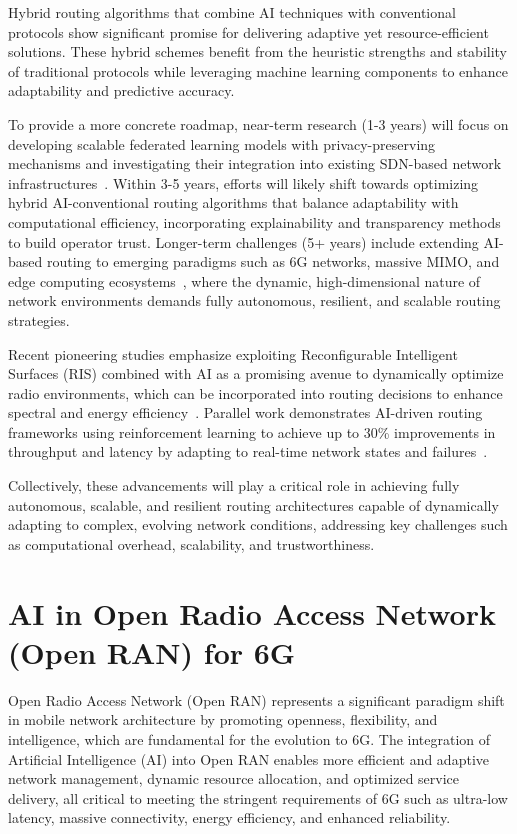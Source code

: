 \documentclass[sigconf]{acmart}
\begin{document}
Hybrid routing algorithms that combine AI techniques with conventional protocols show significant promise for delivering adaptive yet resource-efficient solutions. These hybrid schemes benefit from the heuristic strengths and stability of traditional protocols while leveraging machine learning components to enhance adaptability and predictive accuracy.

To provide a more concrete roadmap, near-term research (1-3 years) will focus on developing scalable federated learning models with privacy-preserving mechanisms and investigating their integration into existing SDN-based network infrastructures~\cite{ref53}. Within 3-5 years, efforts will likely shift towards optimizing hybrid AI-conventional routing algorithms that balance adaptability with computational efficiency, incorporating explainability and transparency methods to build operator trust. Longer-term challenges (5+ years) include extending AI-based routing to emerging paradigms such as 6G networks, massive MIMO, and edge computing ecosystems~\cite{ref53,ref49}, where the dynamic, high-dimensional nature of network environments demands fully autonomous, resilient, and scalable routing strategies.

Recent pioneering studies emphasize exploiting Reconfigurable Intelligent Surfaces (RIS) combined with AI as a promising avenue to dynamically optimize radio environments, which can be incorporated into routing decisions to enhance spectral and energy efficiency~\cite{ref49}. Parallel work demonstrates AI-driven routing frameworks using reinforcement learning to achieve up to 30\% improvements in throughput and latency by adapting to real-time network states and failures~\cite{ref53}.

Collectively, these advancements will play a critical role in achieving fully autonomous, scalable, and resilient routing architectures capable of dynamically adapting to complex, evolving network conditions, addressing key challenges such as computational overhead, scalability, and trustworthiness.

\section{AI in Open Radio Access Network (Open RAN) for 6G}
Open Radio Access Network (Open RAN) represents a significant paradigm shift in mobile network architecture by promoting openness, flexibility, and intelligence, which are fundamental for the evolution to 6G. The integration of Artificial Intelligence (AI) into Open RAN enables more efficient and adaptive network management, dynamic resource allocation, and optimized service delivery, all critical to meeting the stringent requirements of 6G such as ultra-low latency, massive connectivity, energy efficiency, and enhanced reliability.
\end{document}
